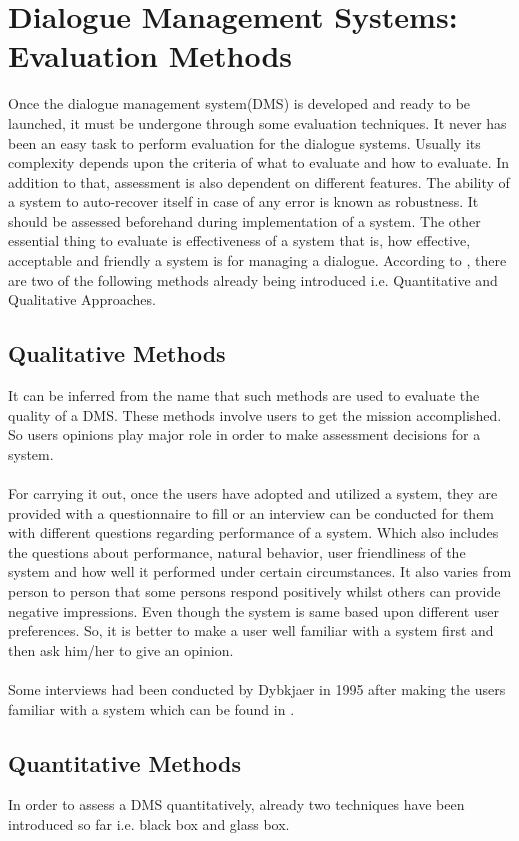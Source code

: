 \section{Dialogue Management Systems: Evaluation Methods}
Once the dialogue management system(DMS) is developed and ready to be launched, it must be undergone through some evaluation techniques. It never has been an easy task to perform evaluation for the dialogue systems. Usually its complexity depends upon the criteria of what to evaluate and how to evaluate. In addition to that, assessment is also dependent on different features. The ability of a system to auto-recover itself in case of any error is known as robustness. It should be assessed beforehand during implementation of a system. The other essential thing to evaluate is effectiveness of a system that is, how effective, acceptable and friendly a system is for managing a dialogue. According to \cite{dialoguemanagementsystems}, there are two of the following methods already being introduced i.e. Quantitative and Qualitative Approaches.

\subsection{Qualitative Methods}
It can be inferred from the name that such methods are used to evaluate the quality of a DMS. These methods involve users to get the mission accomplished. So users opinions play major role in order to make assessment decisions for a system. 
\\~\\
For carrying it out, once the users have adopted and utilized a system, they are provided with a questionnaire to fill or an interview can be conducted for them with different questions regarding performance of a system. Which also includes the questions about performance, natural behavior, user friendliness of the system and how well it performed under certain circumstances. It also varies from person to person that some persons respond positively whilst others can provide negative impressions. Even though the system is same based upon different user preferences. So, it is better to make a user well familiar with a system first and then ask him/her to give an opinion.
\\~\\
Some interviews had been conducted by Dybkjaer in 1995 after making the users familiar with a system which can be found in \cite{qualitativeevaluation}.

\subsection{Quantitative Methods}
In order to assess a DMS quantitatively, already two techniques have been introduced so far i.e. black box and glass box. 

